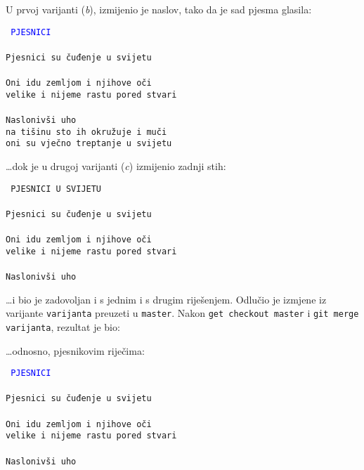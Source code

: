 

U prvoj varijanti (\emph b), izmijenio je naslov, tako da je sad pjesma glasila:

\vspace{5mm}
\noindent\texttt{%
\textcolor{blue}{PJESNICI}\\%
\\%
Pjesnici su čuđenje u svijetu\\%
\\%
Oni idu zemljom i njihove oči\\%
velike i nijeme rastu pored stvari\\%
\\%
Naslonivši uho\\%
na tišinu sto ih okružuje i muči\\%
oni su vječno treptanje u svijetu}
\vspace{5mm}

\dots{}dok je u drugoj varijanti (\emph c) izmijenio zadnji stih:

\vspace{5mm}
\noindent\texttt{%
PJESNICI U SVIJETU\\%
\\%
Pjesnici su čuđenje u svijetu\\%
\\%
Oni idu zemljom i njihove oči\\%
velike i nijeme rastu pored stvari\\%
\\%
Naslonivši uho\\%
\color{blue}{na ćutanje sto ih okružuje i muči\\%
pjesnici su vječno treptanje u svijetu}}
\vspace{5mm}

\dots{}i bio je zadovoljan i s jednim i s drugim riješenjem.
Odlučio je izmjene iz varijante \verb+varijanta+ preuzeti u \verb+master+.
Nakon \verb+get checkout master+ i \verb+git merge varijanta+, rezultat je bio:



\dots{}odnosno, pjesnikovim riječima:

\vspace{5mm}
\noindent\texttt{%
\textcolor{blue}{PJESNICI}\\%
\\%
Pjesnici su čuđenje u svijetu\\%
\\%
Oni idu zemljom i njihove oči\\%
velike i nijeme rastu pored stvari\\%
\\%
Naslonivši uho\\%
\color{blue}{na ćutanje sto ih okružuje i muči\\%
pjesnici su vječno treptanje u svijetu}}
\vspace{5mm}


